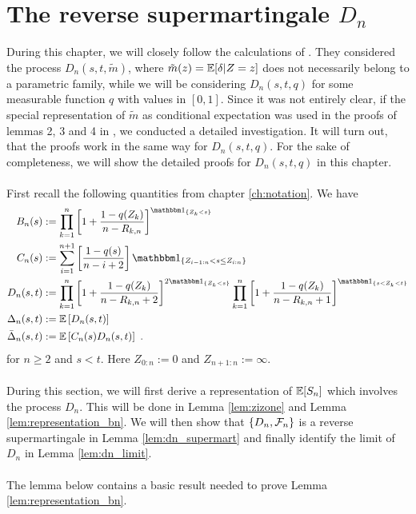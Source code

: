 \section{The reverse supermartingale $D_n$}\label{sec:supermart}
During this chapter, we will closely follow the calculations of \cite{bose1999strong}. They considered the process $D_n(s,t,\tilde m)$, where $\tilde m(z) = \mathbb{E}[\delta|Z=z]$ does not necessarily belong to a parametric family, while we will be considering  $D_n(s,t,q)$ for some measurable function $q$ with values in $[0,1]$. Since it was not entirely clear, if the special representation of $\tilde m$ as conditional expectation was used in the proofs of lemmas 2, 3 and 4 in \cite{bose1999strong}, we conducted a detailed investigation. It will turn out, that the proofs work in the same way for $D_n(s,t,q)$. For the sake of completeness, we will show the detailed proofs for $D_n(s,t,q)$ in this chapter.\\
\\
First recall the following quantities from chapter \ref{ch:notation}. We have 
\begin{align*}
B_n(s) &:= \prod_{k=1}^{n}\left[1+\frac{1-q(Z_{k})}{n-R_{k,n}}\right]^{\I{Z_{k} < s}}\\
C_n(s) &:= \sum_{i=1}^{n+1}\left[\frac{1-q(s)}{n-i+2}\right]\I{Z_{i-1:n} < s \leq Z_{i:n}}\\
D_n(s,t) &:= \prod_{k=1}^{n} \left[1+\frac{1-q(Z_k)}{n-R_{k,n} +2}\right]^{2\I{Z_k<s}} \prod_{k=1}^{n}\left[1+\frac{1-q(Z_k)}{n-R_ {k,n}+1}\right]^{\I{s < Z_k < t}}\\
\Delta_n(s,t) &:= \E\left[D_n(s,t) \right]\\
\bar{\Delta}_n(s,t) &:= \E\left[C_n(s)D_n(s,t) \right]\mdot
\end{align*}
for $n\geq 2$ and $s < t$. Here $Z_{0:n} := 0$ and $Z_{n+1:n} := \infty$.\\
\\
During this section, we will first derive a representation of $\mathbb{E}[S_n]$ which involves the process $D_n$. This will be done in Lemma \ref{lem:zizone} and Lemma \ref{lem:representation_bn}. We will then show that $\{D_n,\mathcal{F}_n\}$ is a reverse supermartingale in Lemma \ref{lem:dn_supermart} and finally identify the limit of $D_n$ in Lemma \ref{lem:dn_limit}.\\
\\
The lemma below contains a basic result needed to prove Lemma \ref{lem:representation_bn}.
